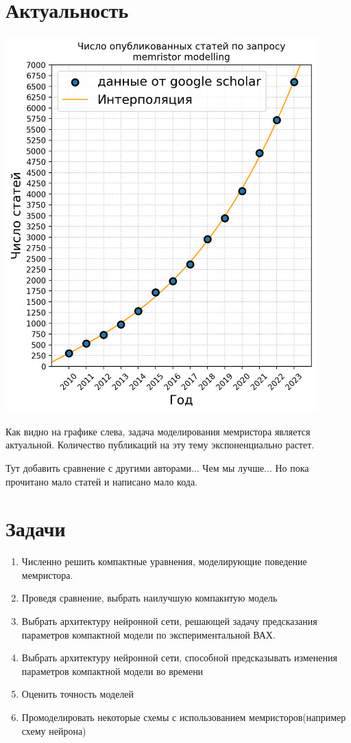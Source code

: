 \documentclass[a4paper]{article}
\begin{document}
\section*{\textcolor{header}{Актуальность}}

\begin{minipage}[l]{0.5\textwidth}
    \includegraphics[width=0.9\textwidth]{actuality.png}
\end{minipage}
\begin{minipage}[r]{0.5\textwidth}
    Как видно на графике слева,  задача моделирования мемристора является актуальной. 
    Количество публикаций на эту тему экспоненциально растет.

    Тут добавить сравнение с другими авторами... Чем мы лучше... Но пока прочитано  мало статей и написано  мало кода.
\end{minipage}

\section*{\textcolor{header}{Задачи}}

\begin{enumerate}
    \item Численно решить компактные уравнения, моделирующие поведение мемристора.
    \item Проведя сравнение, выбрать наилучшую компакнтую модель
    \item Выбрать архитектуру нейронной сети, решающей задачу предсказания параметров компактной модели по экспериментальной ВАХ.
    \item Выбрать архитектуру нейронной сети, способной предсказывать изменения параметров компактной модели во времени
    \item Оценить точность моделей
    \item Промоделировать некоторые схемы с использованием мемристоров(например схему нейрона)
    
\end{enumerate}
   
\end{document}
